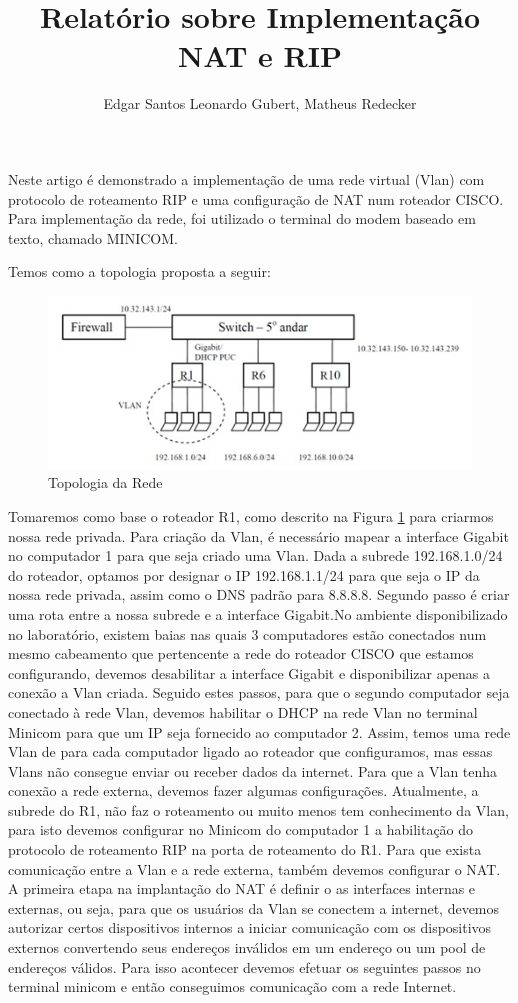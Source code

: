 \documentclass[12pt]{article}
\title{Relatório sobre Implementação NAT e RIP}
\author{Edgar Santos\inst{1} Leonardo Gubert\inst{1}, Matheus Redecker\inst{1}}
\begin{document}
 

\maketitle

Neste artigo é demonstrado a implementação de uma rede virtual (Vlan) com protocolo de roteamento RIP e uma configuração de NAT num roteador CISCO. Para implementação da rede, foi utilizado o terminal do modem baseado em texto, chamado MINICOM.

Temos como a topologia proposta a seguir:

\begin{figure}[h]
\centering
\includegraphics[scale=1]{topologia.jpg}
\caption{Topologia da Rede}
\label{topologia}
\end{figure}

Tomaremos como base o roteador R1, como descrito na Figura \ref{topologia} para criarmos nossa rede privada. 
Para criação da Vlan, é necessário mapear a interface Gigabit no computador 1 para que seja criado uma Vlan. Dada a subrede 192.168.1.0/24 do roteador, optamos por designar o IP 192.168.1.1/24 para que seja o IP da nossa rede privada, assim como o DNS padrão para 8.8.8.8. Segundo passo é criar uma rota entre a nossa subrede e a interface Gigabit.No ambiente disponibilizado no laboratório, existem baias nas quais 3 computadores estão conectados num mesmo cabeamento que pertencente a rede do roteador CISCO que estamos configurando, devemos desabilitar a interface Gigabit e disponibilizar apenas a conexão a Vlan criada. Seguido estes passos, para que o segundo computador seja conectado à rede Vlan, devemos habilitar o DHCP na rede Vlan no terminal Minicom para que um IP seja fornecido ao computador 2. Assim, temos uma rede Vlan de para cada computador ligado ao roteador que configuramos, mas essas Vlans não consegue enviar ou receber dados da internet. Para que a Vlan tenha conexão a rede externa, devemos fazer algumas configurações. Atualmente, a subrede do R1, não faz o roteamento ou muito menos tem conhecimento da Vlan, para isto devemos configurar no Minicom do computador 1 a habilitação do protocolo de roteamento RIP na porta de roteamento do R1. Para que exista comunicação entre a Vlan e a rede externa, também devemos configurar o NAT. A primeira etapa na implantação do NAT é definir o as interfaces internas e externas, ou seja, para que os usuários da Vlan se conectem a internet, devemos autorizar certos dispositivos internos a iniciar comunicação com os dispositivos externos convertendo seus endereços inválidos em um endereço ou um pool de endereços válidos.
Para isso acontecer devemos efetuar os seguintes passos no terminal minicom e então conseguimos comunicação com a rede Internet.
\end{document}
